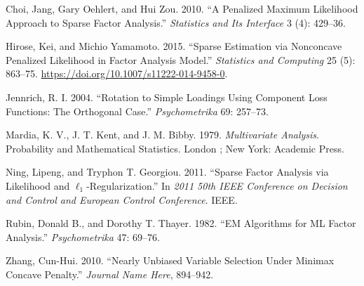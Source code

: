 \documentclass[
  12pt,
]{amsart}
\newlength{\cslhangindent}
\newenvironment{CSLReferences}[2] %
 {\begin{list}{}{%
  \setlength{\itemindent}{0pt}
  \setlength{\leftmargin}{0pt}
  \setlength{\parsep}{0pt}
  \ifodd #1
   \setlength{\leftmargin}{\cslhangindent}
   \setlength{\itemindent}{-1\cslhangindent}
  \fi
  \setlength{\itemsep}{#2\baselineskip}}}
 {\end{list}}
\begin{document}
\label{refs}
\begin{CSLReferences}{1}{0}
Choi, Jang, Gary Oehlert, and Hui Zou. 2010. {``A Penalized Maximum
Likelihood Approach to Sparse Factor Analysis.''} \emph{Statistics and
Its Interface} 3 (4): 429--36.

Hirose, Kei, and Michio Yamamoto. 2015. {``Sparse Estimation via
Nonconcave Penalized Likelihood in Factor Analysis Model.''}
\emph{Statistics and Computing} 25 (5): 863--75.
\url{https://doi.org/10.1007/s11222-014-9458-0}.

Jennrich, R. I. 2004. {``Rotation to Simple Loadings Using Component
Loss Functions: The Orthogonal Case.''} \emph{Psychometrika} 69:
257--73.

Mardia, K. V., J. T. Kent, and J. M. Bibby. 1979. \emph{Multivariate
Analysis}. Probability and Mathematical Statistics. London ; New York:
Academic Press.

Ning, Lipeng, and Tryphon T. Georgiou. 2011. {``Sparse Factor Analysis
via Likelihood and \(\ell_1\)-Regularization.''} In \emph{2011 50th IEEE
Conference on Decision and Control and European Control Conference}.
IEEE.

Rubin, Donald B., and Dorothy T. Thayer. 1982. {``EM Algorithms for ML
Factor Analysis.''} \emph{Psychometrika} 47: 69--76.

Zhang, Cun-Hui. 2010. {``Nearly Unbiased Variable Selection Under
Minimax Concave Penalty.''} \emph{Journal Name Here}, 894--942.

\end{CSLReferences}
\end{document}
